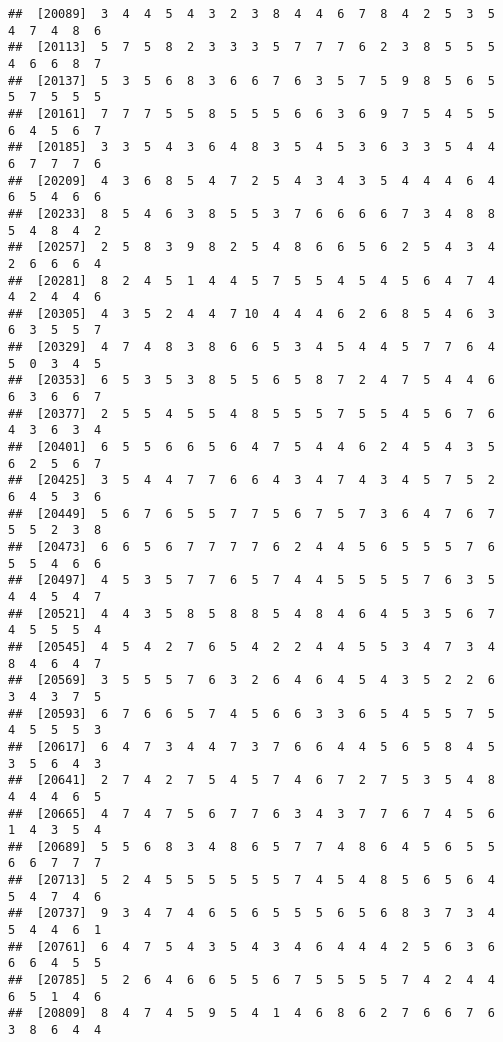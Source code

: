 \documentclass[
]{book}
\begin{document}
\begin{verbatim}
##  [20089]  3  4  4  5  4  3  2  3  8  4  4  6  7  8  4  2  5  3  5  4  7  4  8  6
##  [20113]  5  7  5  8  2  3  3  3  5  7  7  7  6  2  3  8  5  5  5  4  6  6  8  7
##  [20137]  5  3  5  6  8  3  6  6  7  6  3  5  7  5  9  8  5  6  5  5  7  5  5  5
##  [20161]  7  7  7  5  5  8  5  5  5  6  6  3  6  9  7  5  4  5  5  6  4  5  6  7
##  [20185]  3  3  5  4  3  6  4  8  3  5  4  5  3  6  3  3  5  4  4  6  7  7  7  6
##  [20209]  4  3  6  8  5  4  7  2  5  4  3  4  3  5  4  4  4  6  4  6  5  4  6  6
##  [20233]  8  5  4  6  3  8  5  5  3  7  6  6  6  6  7  3  4  8  8  5  4  8  4  2
##  [20257]  2  5  8  3  9  8  2  5  4  8  6  6  5  6  2  5  4  3  4  2  6  6  6  4
##  [20281]  8  2  4  5  1  4  4  5  7  5  5  4  5  4  5  6  4  7  4  4  2  4  4  6
##  [20305]  4  3  5  2  4  4  7 10  4  4  4  6  2  6  8  5  4  6  3  6  3  5  5  7
##  [20329]  4  7  4  8  3  8  6  6  5  3  4  5  4  4  5  7  7  6  4  5  0  3  4  5
##  [20353]  6  5  3  5  3  8  5  5  6  5  8  7  2  4  7  5  4  4  6  6  3  6  6  7
##  [20377]  2  5  5  4  5  5  4  8  5  5  5  7  5  5  4  5  6  7  6  4  3  6  3  4
##  [20401]  6  5  5  6  6  5  6  4  7  5  4  4  6  2  4  5  4  3  5  6  2  5  6  7
##  [20425]  3  5  4  4  7  7  6  6  4  3  4  7  4  3  4  5  7  5  2  6  4  5  3  6
##  [20449]  5  6  7  6  5  5  7  7  5  6  7  5  7  3  6  4  7  6  7  5  5  2  3  8
##  [20473]  6  6  5  6  7  7  7  7  6  2  4  4  5  6  5  5  5  7  6  5  5  4  6  6
##  [20497]  4  5  3  5  7  7  6  5  7  4  4  5  5  5  5  7  6  3  5  4  4  5  4  7
##  [20521]  4  4  3  5  8  5  8  8  5  4  8  4  6  4  5  3  5  6  7  4  5  5  5  4
##  [20545]  4  5  4  2  7  6  5  4  2  2  4  4  5  5  3  4  7  3  4  8  4  6  4  7
##  [20569]  3  5  5  5  7  6  3  2  6  4  6  4  5  4  3  5  2  2  6  3  4  3  7  5
##  [20593]  6  7  6  6  5  7  4  5  6  6  3  3  6  5  4  5  5  7  5  4  5  5  5  3
##  [20617]  6  4  7  3  4  4  7  3  7  6  6  4  4  5  6  5  8  4  5  3  5  6  4  3
##  [20641]  2  7  4  2  7  5  4  5  7  4  6  7  2  7  5  3  5  4  8  4  4  4  6  5
##  [20665]  4  7  4  7  5  6  7  7  6  3  4  3  7  7  6  7  4  5  6  1  4  3  5  4
##  [20689]  5  5  6  8  3  4  8  6  5  7  7  4  8  6  4  5  6  5  5  6  6  7  7  7
##  [20713]  5  2  4  5  5  5  5  5  5  7  4  5  4  8  5  6  5  6  4  5  4  7  4  6
##  [20737]  9  3  4  7  4  6  5  6  5  5  5  6  5  6  8  3  7  3  4  5  4  4  6  1
##  [20761]  6  4  7  5  4  3  5  4  3  4  6  4  4  4  2  5  6  3  6  6  6  4  5  5
##  [20785]  5  2  6  4  6  6  5  5  6  7  5  5  5  5  7  4  2  4  4  6  5  1  4  6
##  [20809]  8  4  7  4  5  9  5  4  1  4  6  8  6  2  7  6  6  7  6  3  8  6  4  4

\end{verbatim}
\end{document}
